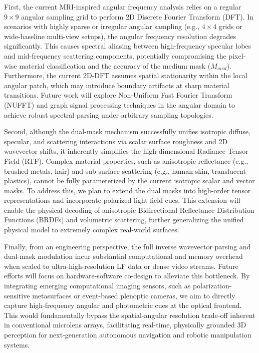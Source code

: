 First, the current MRI-inspired angular frequency analysis relies on a regular $9 \times 9$ angular sampling grid to perform 2D Discrete Fourier Transform (DFT). In scenarios with highly sparse or irregular angular sampling (e.g., $4 \times 4$ grids or wide-baseline multi-view setups), the angular frequency resolution degrades significantly. This causes spectral aliasing between high-frequency specular lobes and mid-frequency scattering components, potentially compromising the pixel-wise material classification and the accuracy of the medium mask ($M_{med}$). Furthermore, the current 2D-DFT assumes spatial stationarity within the local angular patch, which may introduce boundary artifacts at sharp material transitions. Future work will explore Non-Uniform Fast Fourier Transform (NUFFT) and graph signal processing techniques in the angular domain to achieve robust spectral parsing under arbitrary sampling topologies.

Second, although the dual-mask mechanism successfully unifies isotropic diffuse, specular, and scattering interactions via scalar surface roughness and 2D wavevector shifts, it inherently simplifies the high-dimensional Radiance Tensor Field (RTF). Complex material properties, such as anisotropic reflectance (e.g., brushed metals, hair) and sub-surface scattering (e.g., human skin, translucent plastics), cannot be fully parameterized by the current isotropic scalar and vector masks. To address this, we plan to extend the dual masks into high-order tensor representations and incorporate polarized light field cues. This extension will enable the physical decoding of anisotropic Bidirectional Reflectance Distribution Functions (BRDFs) and volumetric scattering, further generalizing the unified physical model to extremely complex real-world surfaces.

Finally, from an engineering perspective, the full inverse wavevector parsing and dual-mask modulation incur substantial computational and memory overhead when scaled to ultra-high-resolution LF data or dense video streams. Future efforts will focus on hardware-software co-design to alleviate this bottleneck. By integrating emerging computational imaging sensors, such as polarization-sensitive metasurfaces or event-based plenoptic cameras, we aim to directly capture high-frequency angular and photometric cues at the optical frontend. This would fundamentally bypass the spatial-angular resolution trade-off inherent in conventional microlens arrays, facilitating real-time, physically grounded 3D perception for next-generation autonomous navigation and robotic manipulation systems.